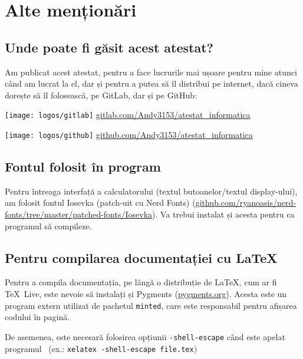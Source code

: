 \section{Alte menționări}
\subsection{Unde poate fi găsit acest atestat?}\label{links}
Am publicat acest atestat, pentru a face lucrurile mai ușoare pentru mine atunci când am lucrat la el, dar și pentru a putea să îl distribui pe internet, dacă cineva dorește să îl folosească, pe GitLab, dar și pe GitHub:

\begin{center}
 \texttt{[image: logos/gitlab]}
 \url{gitlab.com/Andy3153/atestat_informatica}
  
 \texttt{[image: logos/github]}
 \url{github.com/Andy3153/atestat_informatica}
\end{center}

\subsection{Fontul folosit în program}
Pentru întreaga interfață a calculatorului (textul butoanelor/textul display-ului), am folosit fontul Iosevka (patch-uit cu Nerd Fonts) (\url{github.com/ryanoasis/nerd-fonts/tree/master/patched-fonts/Iosevka}). Va trebui instalat și acesta pentru ca programul să compileze.

\subsection{Pentru compilarea documentației cu \LaTeX}
Pentru a compila documentația, pe lângă o distribuție de \LaTeX, cum ar fi \TeX\ Live, este nevoie să instalați și Pygments (\url{pygments.org}). Acesta este un program extern utilizat de pachetul \texttt{minted}, care este responsabil pentru afișarea codului în pagină.

De asemenea, este necesară folosirea opțiunii \texttt{-shell-escape} când este apelat programul \XeLaTeX\ (ex.: \texttt{xelatex -shell-escape file.tex})
